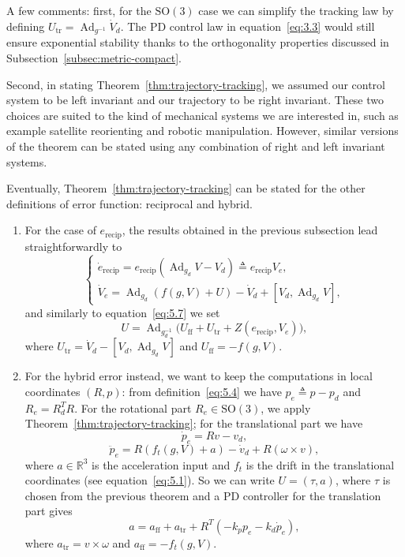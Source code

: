 \documentclass[11pt]{article}
\newcommand{\SO}{\mathrm{SO}}
\newcommand{\Ad}{\operatorname{Ad}}
\newcommand{\R}{\mathbb R}
\begin{document}
A few comments: first, for the $\SO(3)$ case we can simplify the tracking law by defining $U_{\mathrm{tr}}=\Ad_{g^{-1}}\dot V_d$. The PD control law in equation~\eqref{eq:3.3} would still ensure exponential stability thanks to the orthogonality properties discussed in Subsection~\ref{subsec:metric-compact}.

Second, in stating Theorem~\ref{thm:trajectory-tracking}, we assumed our control system to be left invariant and our trajectory to be right invariant. These two choices are suited to the kind of mechanical systems we are interested in, such as example satellite reorienting and robotic manipulation. However, similar versions of the theorem can be stated using any combination of right and left invariant systems.

Eventually, Theorem~\ref{thm:trajectory-tracking} can be stated for the other definitions of error function: reciprocal and hybrid.
\begin{enumerate}
\item For the case of $e_{\mathrm{recip}}$, the results obtained in the previous subsection lead straightforwardly to
\begin{equation*}
\begin{cases}
\dot e_{\mathrm{recip}}=e_{\mathrm{recip}}(\Ad_{g_d}V-V_d)\triangleq e_{\mathrm{recip}}V_e,\\
\dot V_e=\Ad_{g_d}(f(g,V)+U)-\dot V_d+[V_d,\Ad_{g_d}V],
\end{cases}
\end{equation*}
and similarly to equation~\eqref{eq:5.7} we set
\begin{equation*}
U=\Ad_{g_d^{-1}}\bigl(U_{\mathrm{ff}}+U_{\mathrm{tr}}+Z(e_{\mathrm{recip}},V_e)\bigr),
\end{equation*}
where $U_{\mathrm{tr}}=\dot V_d-[V_d,\Ad_{g_d}V]$ and $U_{\mathrm{ff}}=-f(g,V)$.
\item For the hybrid error instead, we want to keep the computations in local coordinates $(R,p)$: from definition~\eqref{eq:5.4} we have $p_e\triangleq p-p_d$ and $R_e=R_d^TR$. For the rotational part $R_e\in\SO(3)$, we apply Theorem~\ref{thm:trajectory-tracking}; for the translational part we have
\begin{equation*}
\dot p_e=Rv-v_d,
\end{equation*}
\begin{equation*}
\ddot p_e=R(f_t(g,V)+a)-\dot v_d+R(\omega\times v),
\end{equation*}
where $a\in\R^3$ is the acceleration input and $f_t$ is the drift in the translational coordinates (see equation~\eqref{eq:5.1}). So we can write $U=(\tau,a)$, where $\tau$ is chosen from the previous theorem and a PD controller for the translation part gives
\begin{equation*}
a=a_{\mathrm{ff}}+a_{\mathrm{tr}}+R^T(-k_pp_e-k_d\dot p_e),\tag{5.8}\label{eq:5.8}
\end{equation*}
where $a_{\mathrm{tr}}=v\times\omega$ and $a_{\mathrm{ff}}=-f_t(g,V)$.
\end{enumerate}
\end{document}
